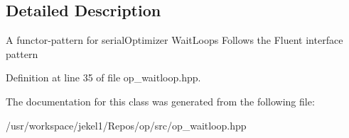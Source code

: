 \subsection{Detailed Description}
A functor-\/pattern for serial\-Optimizer Wait\-Loops Follows the Fluent interface pattern 

Definition at line 35 of file op\-\_\-waitloop.\-hpp.



The documentation for this class was generated from the following file\-:\begin{DoxyCompactItemize}
\item 
/usr/workspace/jekel1/\-Repos/op/src/op\-\_\-waitloop.\-hpp\end{DoxyCompactItemize}
